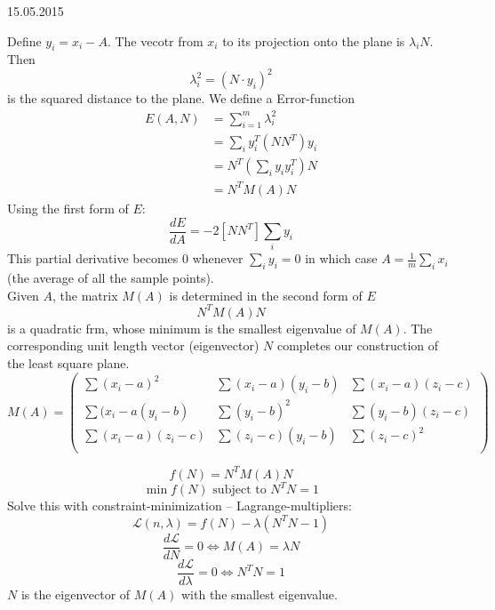 \documentclass[a4paper,10pt,ngerman]{article}
\begin{document}
\begin{section}{15.05.2015}
 
 Define $y_i = x_i-A$. The vecotr from $x_i$ to its projection onto the plane is $\lambda_i N$. Then
 \[\lambda_i^2 = (N\cdot y_i)^2\]
 is the squared distance to the plane. We define a Error-function
 \begin{align*}
  E(A,N) &= \sum_{i=1}^m \lambda_i^2 \\
  &= \sum_i y_i^T (NN^T) y_i \\
  &= N^T(\sum_i y_i y_i^T) N \\
  &= N^T M(A) N
 \end{align*}
 Using the first form of $E$:
 \[\frac{dE}{dA} = -2 [NN^T]\sum_i y_i\]
 This partial derivative becomes $0$ whenever $\sum_i y_i = 0$ in which case $A = \frac{1}{m} \sum_i x_i$ (the average of all the sample points).\\
 Given $A$, the matrix $M(A)$ is determined in the second form of $E$
 \[ N^T M(A) N\]
 is a quadratic frm, whose minimum is the smallest eigenvalue of $M(A)$. The corresponding unit length vector (eigenvector) $N$ completes our construction of the least square plane.
 \[ M(A) = \begin{pmatrix} 
\sum (x_i -a)^2  & \sum (x_i -a)(y_i - b) & \sum (x_i-a)(z_i-c)\\ 
\sum (x_i -a (y_i-b) & \sum (y_i-b)^2 & \sum (y_i-b)(z_i-c)\\ 
\sum (x_i-a)(z_i-c) & \sum (z_i -c)(y_i -b) & \sum (z_i-c)^2\\ 
           \end{pmatrix}
\]

\[ f(N) = N^TM(A)N \]
\[ \min f(N) \text{ subject to } N^TN = 1\]
Solve this with constraint-minimization -- Lagrange-multipliers:
\[\mathcal{L}(n,\lambda) = f(N) - \lambda(N^TN -1)\]
\[\frac{d \mathcal{L}}{dN} = 0 \Leftrightarrow M(A) = \lambda N\]
\[\frac{d \mathcal{L}}{d\lambda} = 0 \Leftrightarrow  N^TN = 1\]
$N$ is the eigenvector of $M(A)$ with the smallest eigenvalue.


\end{section}
\end{document}
